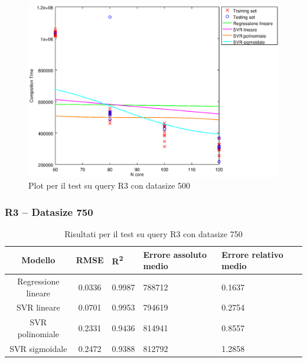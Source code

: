 \documentclass[a4paper,11pt]{article}
\begin{document}
\begin {figure}[hbtp]
\centering
\includegraphics[width=\textwidth]{output/R3_500/plot_R3_500.eps}
\caption {Plot per il test su query R3 con datasize 500}
\end {figure}
\newpage
\subsubsection{R3 -- Datasize 750}
\begin{table}[bhpt]
	\centering
	\begin{adjustbox}{center}
		\begin{tabular}{c | c M{1cm} M{2.5cm} M{2.5cm} M{1.8cm}}
			Modello & RMSE & R\textsuperscript{2} & Errore assoluto medio & Errore relativo medio \tabularnewline
			\hline
			Regressione lineare & 0.0336 & 0.9987 & 788712 & 0.1637 \\
			SVR lineare & 0.0701 & 0.9953 & 794619 & 0.2754 \\
			SVR polinomiale & 0.2331 & 0.9436 & 814941 & 0.8557 \\
			SVR sigmoidale & 0.2472 & 0.9388 & 812792 & 1.2858 \\
		\end{tabular}
	\end{adjustbox}
	\\
	\caption{Risultati per il test su query R3 con datasize 750}
	\label{table_R3_750}
\end{table}
\end{document}
